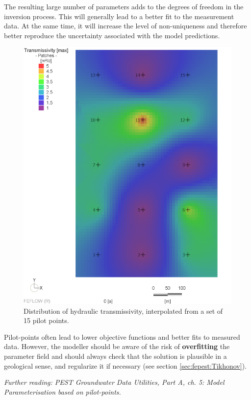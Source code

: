 The resulting large number of parameters adds to the degrees of freedom in the inversion process. This will generally lead to a better fit to the measurement data. At the same time, it will increase the level of non-uniqueness and therefore better reproduce the uncertainty associated with the model predictions.


\begin{figure}
	\center
	\includegraphics[width=\columnwidth]{figures/PilotPointInterpolation.png}
\caption{Distribution of hydraulic transmissivity, interpolated from a set of 15 pilot points.}
\label{fig:fepest:PilotPointInterpolation}
\end{figure}

Pilot-points often lead to lower objective functions and better fits to measured data. However, the modeller should be aware of the risk of \textbf{overfitting} the parameter field and should always check that the solution is plausible in a geological sense, and regularize it if necessary (see section \ref{sec:fepest:Tikhonov}).

\textit{Further reading: PEST Groundwater Data Utilities, Part A, ch. 5: Model Parameterisation based on pilot-points.}

